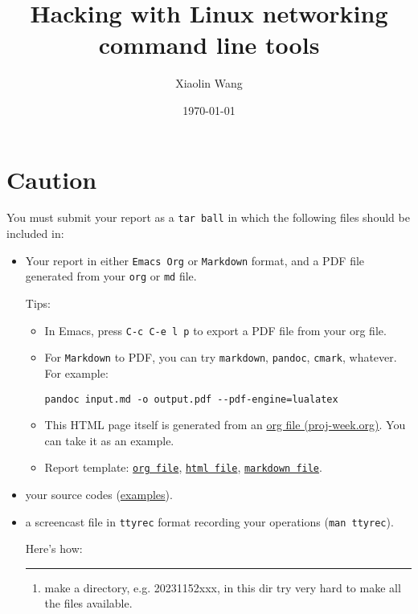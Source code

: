 \documentclass{article}
\author{Xiaolin Wang}
\date{\today}
\title{Hacking with Linux networking command line tools}
\begin{document}
\maketitle
\tableofcontents


\section{Caution}
\label{sec:org78dbaf4}
You must submit your report as a \texttt{tar ball} in which the following files
should be included in:

\begin{itemize}
\item Your report in either \texttt{Emacs Org} or \texttt{Markdown} format, and a PDF file
generated from your \texttt{org} or \texttt{md} file.

Tips: 
\begin{itemize}
\item In Emacs, press \texttt{C-c C-e l p} to export a PDF file from your org file.

\item For \texttt{Markdown} to PDF, you can try \texttt{markdown}, \texttt{pandoc}, \texttt{cmark},
whatever. For example:

\begin{verbatim}
pandoc input.md -o output.pdf --pdf-engine=lualatex
\end{verbatim}

\item This HTML page itself is generated from an \href{proj-week.org}{org file
(proj-week.org)}. You can take it as an example.

\item Report template: \href{20231152xxx.org}{\texttt{org file}}, \href{20231152xxx.pdf}{\texttt{html file}}, \href{20231152xxx.md}{\texttt{markdown file}}.
\end{itemize}

\item your source codes (\href{https://cs6.swfu.edu.cn/\~wx672/lecture\_notes/network\_basics/scripts/}{examples}).

\item a screencast file in \texttt{ttyrec} format recording your operations (\texttt{man ttyrec}).

Here's how:

\noindent\rule{\textwidth}{0.5pt}
\begin{enumerate}
\item make a directory, e.g. 20231152xxx, in this dir try very hard to make all
the files available.


\end{enumerate}
\end{itemize}
\end{document}
